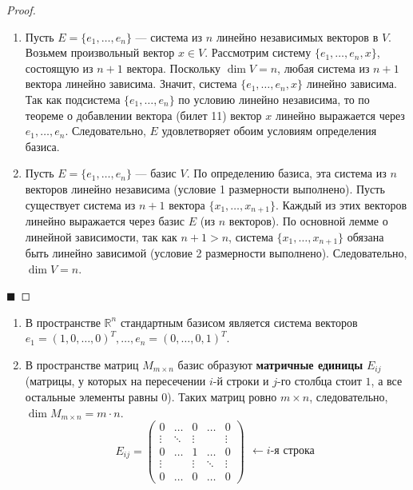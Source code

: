 \begin{proof}
\begin{enumerate}
    \item Пусть $E = \{e_1, \dots, e_n\}$ --- система из $n$ линейно независимых векторов в $V$. Возьмем произвольный вектор $x \in V$. Рассмотрим систему $\{e_1, \dots, e_n, x\}$, состоящую из $n+1$ вектора. Поскольку $\dim V = n$, любая система из $n+1$ вектора линейно зависима. Значит, система $\{e_1, \dots, e_n, x\}$ линейно зависима. 
    Так как подсистема $\{e_1, \dots, e_n\}$ по условию линейно независима, то по теореме о добавлении вектора (билет 11) вектор $x$ линейно выражается через $e_1, \dots, e_n$. Следовательно, $E$ удовлетворяет обоим условиям определения базиса.
    
    \item Пусть $E = \{e_1, \dots, e_n\}$ --- базис $V$. По определению базиса, эта система из $n$ векторов линейно независима (условие 1 размерности выполнено). Пусть существует система из $n+1$ вектора $\{x_1, \dots, x_{n+1}\}$. Каждый из этих векторов линейно выражается через базис $E$ (из $n$ векторов). По основной лемме о линейной зависимости, так как $n+1 > n$, система $\{x_1, \dots, x_{n+1}\}$ обязана быть линейно зависимой (условие 2 размерности выполнено). Следовательно, $\dim V = n$.
\end{enumerate}
\hfill$\blacksquare$
\end{proof}

\begin{example}
\begin{enumerate}
    \item В пространстве $\mathbb{R}^n$ стандартным базисом является система векторов $e_1 = (1, 0, \dots, 0)^T, \dots, e_n = (0, \dots, 0, 1)^T$.
    \item В пространстве матриц $M_{m \times n}$ базис образуют \textbf{матричные единицы} $E_{ij}$ (матрицы, у которых на пересечении $i$-й строки и $j$-го столбца стоит $1$, а все остальные элементы равны $0$). Таких матриц ровно $m \times n$, следовательно, $\dim M_{m \times n} = m \cdot n$.
    \[
    E_{ij} = \begin{pmatrix}
    0 & \dots & 0 & \dots & 0 \\
    \vdots & \ddots & \vdots & & \vdots \\
    0 & \dots & 1 & \dots & 0 \\
    \vdots & & \vdots & \ddots & \vdots \\
    0 & \dots & 0 & \dots & 0
    \end{pmatrix}
    \begin{matrix}
    \\ \\ \leftarrow i\text{-я строка} \\ \\
    \end{matrix}
    \]
\end{enumerate}
\end{example}
